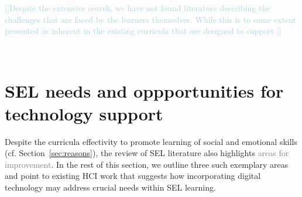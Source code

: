 \documentclass[prodmode,acmtochi]{acmsmall}
\newcommand{\todo}[1]{\textrm{\textrm{\textcolor{LightBlue}{[[#1]]} } } }
\newcommand{\rephrase}[1]{\textrm{\textrm{\textcolor{gray}{#1}}}}
\begin{document}
\todo{Despite the extensive search, we have not found literature describing the challenges that are faced by the learners themselves. While this is to some extent presented as inherent in the existing curricula that are designed to support }

\fi

\vfill ~ \pagebreak
\section{SEL needs and oppportunities for technology support}
\label{sec:HCIsupport}

Despite the curricula effectivity to promote learning of social and emotional skills (cf. Section~\ref{sec:reasons}), the review of SEL literature also highlights \rephrase{areas for improvement}. In the rest of this section, we outline three such exemplary areas and point to existing HCI work that suggests how incorporating digital technology may address crucial needs within SEL learning.








%
\end{document}
